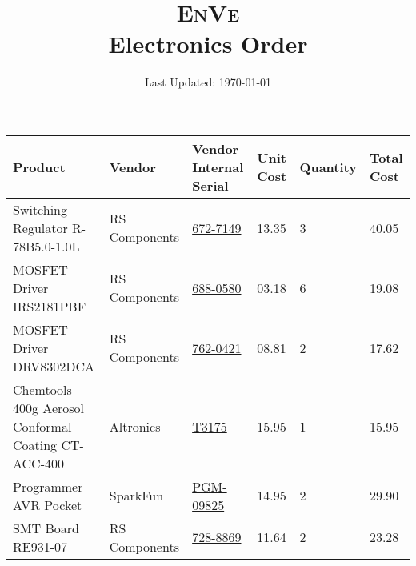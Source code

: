 \documentclass[a4paper,landscape]{article}
\title{\Large \textsc{EnVe}\\ \textbf{Electronics Order}}
\date{Last Updated: \today}
\begin{document}
    \maketitle


    \hspace*{-5cm}\begin{tabular}{llllll}
    \hline
    \bfseries
    Product & \bfseries Vendor & \bfseries Vendor Internal Serial & \bfseries Unit Cost & \bfseries Quantity & \bfseries Total Cost\\
    \hline
Switching Regulator R-78B5.0-1.0L
    & RS Components
    & \href{http://au.rs-online.com/web/p/switching-regulators/6727149/}{672-7149}
    & 13.35 & 3 & 40.05\\

MOSFET Driver IRS2181PBF
    & RS Components
    & \href{http://au.rs-online.com/web/p/mosfet-power-drivers/6880580/}{688-0580}
    & 03.18 & 6 & 19.08 \\

MOSFET Driver DRV8302DCA
    & RS Components
    & \href{http://au.rs-online.com/web/p/motor-driver-ics/7620421/}{762-0421}
    & 08.81 & 2 & 17.62 \\

Chemtools 400g Aerosol Conformal Coating CT-ACC-400
    & Altronics
    & \href{http://www.altronics.com.au/p/t3175-uv-conformal-coating-aerosol-400g/}{T3175}
    & 15.95 & 1 & 15.95 \\

Programmer AVR Pocket
    & SparkFun
    & \href{https://www.sparkfun.com/products/9825}{PGM-09825}
    & 14.95 & 2 & 29.90 \\

SMT Board RE931-07
    & RS Components
    & \href{http://au.rs-online.com/web/p/surface-mount-smt-to-through-hole-adapter-boards/7288869/?searchTerm=re931-07&relevancy-data=636F3D3226696E3D4931384E4B6E6F776E41734D504E266C753D656E266D6D3D6D61746368616C6C7061727469616C26706D3D5E5B5C707B4C7D5C707B4E647D2D2C2F255C2E5D2B2426706F3D313326736E3D592673743D4D414E5F504152545F4E554D4245522677633D424F5448267573743D72653933312D303726}{728-8869}
    & 11.64 & 2 & 23.28 \\


\end{tabular}
\end{document}
